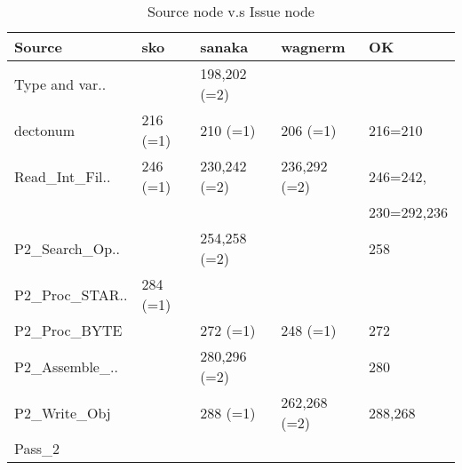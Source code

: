 \begin{table}[hb]
\begin{center}
\begin{tabular}{|l|l|l|l|l|}
\hline
Source & sko & sanaka & wagnerm & OK\\
\hline
Type and var.. &  & 198,202 (=2) &  & \\
dectonum & 216 (=1) & 210 (=1) & 206 (=1) & 216=210\\
Read\_Int\_Fil.. & 246 (=1) & 230,242 (=2) & 236,292 (=2) & 246=242,\\
                 &          &             &               & 230=292,236\\ 
P2\_Search\_Op.. &  & 254,258 (=2) &  & 258\\
P2\_Proc\_STAR.. & 284 (=1) &  &  & \\
P2\_Proc\_BYTE &  & 272 (=1) & 248 (=1) & 272\\
P2\_Assemble\_.. &  & 280,296 (=2) &  & 280\\
P2\_Write\_Obj &  & 288 (=1) & 262,268 (=2) & 288,268\\
Pass\_2 &  &  &  & \\
\hline
\end{tabular}
\caption{Source node v.s Issue node}
\end{center}
\end{table}

%
